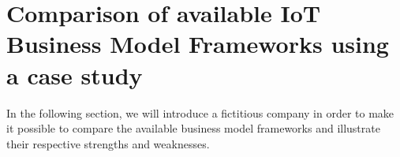 
\section{Comparison of available IoT Business Model Frameworks using a case study}
\label{sec:bmf_comparison}
	In the following section, we will introduce a fictitious company in order to make it possible to compare the available business model frameworks and illustrate their respective strengths and weaknesses.

